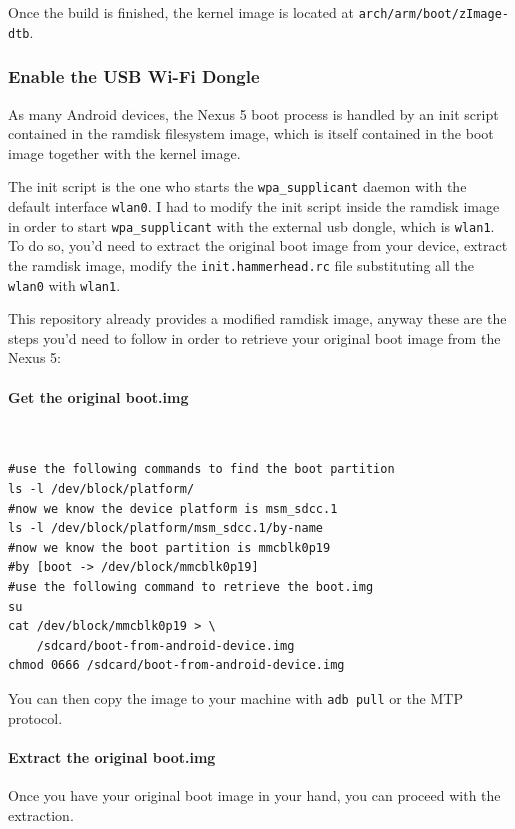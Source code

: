 \documentclass[a4paper]{article}
\begin{document}
Once the build is finished, the kernel image is located at
\texttt{arch/arm/boot/zImage-dtb}.

\subsubsection{Enable the USB Wi-Fi Dongle}
As many Android devices, the Nexus 5 boot process is handled by an init script contained in the ramdisk filesystem image, 
which is itself contained in the boot image together with the kernel image.

The init script is the one who starts the \texttt{wpa\_supplicant} daemon with
the default interface \texttt{wlan0}.
I had to modify the init script inside the ramdisk image in order to
start \texttt{wpa\_supplicant} with the external
usb dongle, which is \texttt{wlan1}. To do so, you'd need to extract the original boot image from your device, extract the ramdisk image,
modify the \texttt{init.hammerhead.rc} file substituting all the \texttt{wlan0}
with \texttt{wlan1}.

This repository already provides a modified ramdisk image, anyway these
are the steps you'd need to follow in order to
 retrieve your original boot image from the Nexus 5:

\paragraph{Get the original boot.img}
  $ $\\ %

\begin{lstlisting}
#use the following commands to find the boot partition
ls -l /dev/block/platform/
#now we know the device platform is msm_sdcc.1
ls -l /dev/block/platform/msm_sdcc.1/by-name
#now we know the boot partition is mmcblk0p19
#by [boot -> /dev/block/mmcblk0p19]
#use the following command to retrieve the boot.img
su
cat /dev/block/mmcblk0p19 > \
    /sdcard/boot-from-android-device.img
chmod 0666 /sdcard/boot-from-android-device.img
\end{lstlisting}

You can then copy the image to your machine with \texttt{adb pull} or the MTP protocol.

\paragraph{Extract the original boot.img}

Once you have your original boot image in your hand, you can proceed with the extraction.
\end{document}
